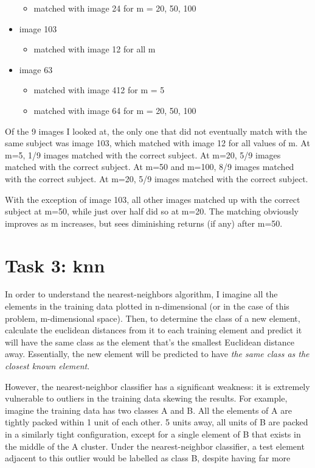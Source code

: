 \documentclass{article}
\begin{document}
\begin{itemize}
\begin{itemize}
        \item matched with image 24 for m = 20, 50, 100
    \end{itemize}
    \item image 103
    \begin{itemize}
        \item matched with image 12 for all m
    \end{itemize}
    \item image 63
    \begin{itemize}
        \item matched with image 412 for m = 5
        \item matched with image 64 for m = 20, 50, 100
    \end{itemize}
\end{itemize}

Of the 9 images I looked at, the only one that did not eventually match with the same subject was image 103, which matched with image 12 for all values of m. At m=5, 1/9 images matched with the correct subject. At m=20, 5/9 images matched with the correct subject. At m=50 and m=100, 8/9 images matched with the correct subject. At m=20, 5/9 images matched with the correct subject.

With the exception of image 103, all other images matched up with the correct subject at m=50, while just over half did so at m=20. The matching obviously improves as m increases, but sees diminishing returns (if any) after m=50.

\section{Task 3: knn}

In order to understand the nearest-neighbors algorithm, I imagine all the elements in the training data plotted in n-dimensional (or in the case of this problem, m-dimensional space). Then, to determine the class of a new element, calculate the euclidean distances from it to each training element and predict it will have the same class as the element that's the smallest Euclidean distance away. Essentially, the new element will be predicted to have \emph{the same class as the closest known element}.

However, the nearest-neighbor classifier has a significant weakness: it is extremely vulnerable to outliers in the training data skewing the results. For example, imagine the training data has two classes A and B. All the elements of A are tightly packed within 1 unit of each other. 5 units away, all units of B are packed in a similarly tight configuration, except for a single element of B that exists in the middle of the A cluster. Under the nearest-neighbor classifier, a test element adjacent to this outlier would be labelled as class B, despite having far more 
\end{document}
